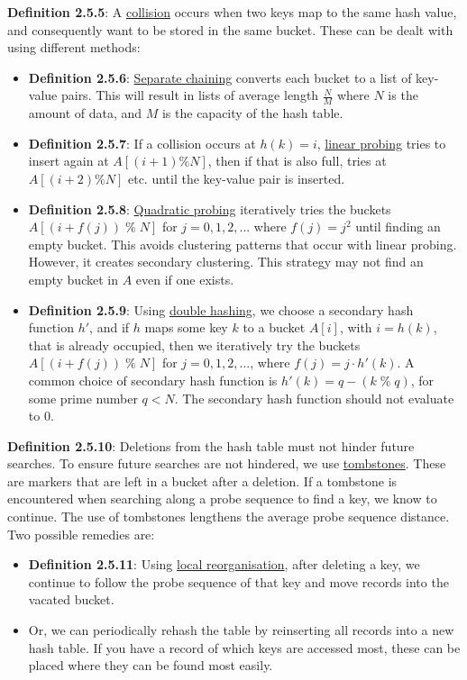 \documentclass{article}
\newcommand{\separate}[1] {\vspace{#1 pt}\noindent}
\newcommand{\definition}[2]{\textbf{Definition #1}: #2\label{def:#1}}
\begin{document}
\separate{5}\definition{2.5.5}{A \underline{collision} occurs when two keys map to the same hash value, and consequently want to be stored in the same bucket. These can be dealt with using different methods:}
\begin{itemize}
    \item \definition{2.5.6}{\underline{Separate chaining} converts each bucket to a list of key-value pairs. This will result in lists of average length \(\frac{N}{M}\) where \(N\) is the amount of data, and \(M\) is the capacity of the hash table.}
    \item \definition{2.5.7}{If a collision occurs at \(h(k)=i\), \underline{linear probing} tries to insert again at \(A[(i+1)\%N]\), then if that is also full, tries at \(A[(i+2)\%N]\) etc. until the key-value pair is inserted.}
    \item \definition{2.5.8}{\underline{Quadratic probing} iteratively tries the buckets \(A[(i+f(j)) \; \% \; N]\) for \(j=0,1,2,...\) where \(f(j)=j^2\) until finding an empty bucket. This avoids clustering patterns that occur with linear probing. However, it creates secondary clustering. This strategy may not find an empty bucket in $A$ even if one exists.}
    \item \definition{2.5.9}{Using \underline{double hashing}, we choose a secondary hash function $h'$, and if $h$ maps some key $k$ to a bucket $A[i]$, with $i=h(k)$, that is already occupied, then we iteratively try the buckets $A[(i+f(j)) \; \% \; N]$ for $j=0,1,2,...$, where $f(j)=j \cdot h'(k)$. A common choice of secondary hash function is $h'(k)=q-(k \; \% \; q)$, for some prime number $q<N$. The secondary hash function should not evaluate to 0. }
\end{itemize}
\definition{2.5.10}{Deletions from the hash table must not hinder future searches. To ensure future searches are not hindered, we use \underline{tombstones}. These are markers that are left in a bucket after a deletion. If a tombstone is encountered when searching along a probe sequence to find a key, we know to continue. The use of tombstones lengthens the average probe sequence distance. Two possible remedies are:}
\begin{itemize}
    \item \definition{2.5.11}{Using \underline{local reorganisation}, after deleting a key, we continue to follow the probe sequence of that key and move records into the vacated bucket.} 
    \item Or, we can periodically rehash the table by reinserting all records into a new hash table. If you have a record of which keys are accessed most, these can be placed where they can be found most easily. 
\end{itemize}
\end{document}
